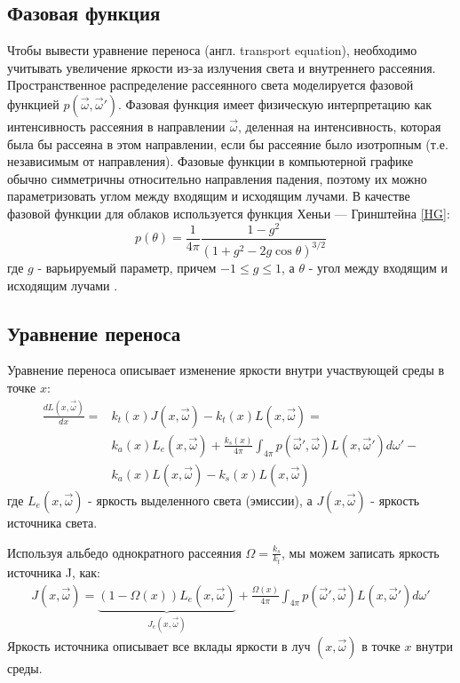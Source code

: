 \subsection{Фазовая функция}
Чтобы вывести уравнение переноса (англ. transport equation), необходимо учитывать увеличение яркости из-за излучения света и внутреннего рассеяния. Пространственное распределение рассеянного света моделируется фазовой функцией $ p(\vec{\omega}, \vec{\omega}') $. Фазовая функция имеет физическую интерпретацию как интенсивность рассеяния в направлении $\vec{\omega}$, деленная на интенсивность, которая была бы рассеяна в этом направлении, если бы рассеяние было изотропным (т.е. независимым от направления). Фазовые функции в компьютерной графике обычно симметричны относительно направления падения, поэтому их можно параметризовать углом между входящим и исходящим лучами. В качестве фазовой функции для облаков используется функция Хеньи — Гринштейна \eqref{HG}:
\begin{equation}
	\label{HG}
	p(\theta) = \frac{1}{4\pi} \frac{1 - g^2}{(1 + g^2 - 2g\cos \theta)^{3/2}}
\end{equation}
где $ g $ - варьируемый параметр, причем $ -1 \leq g \leq 1 $, а $\theta$ - угол между входящим и исходящим лучами \cite{clouds}.

\subsection{Уравнение переноса}
Уравнение переноса описывает изменение яркости внутри участвующей среды в точке $ x $:
\begin{equation}
	\label{rte}
	\begin{aligned}
		\frac{dL(x, \vec{\omega})}{dx} = & k_t(x) J(x, \vec{\omega}) - k_t(x) L(x, \vec{\omega})  = \\
		 & k_a(x) L_e(x, \vec{\omega}) + \frac{k_s(x)}{4\pi} \int_{4\pi} p(\vec{\omega}', \vec{\omega}) L(x, \vec{\omega}') d\omega' - \\
		& k_a(x) L(x, \vec{\omega}) - k_s(x) L(x, \vec{\omega})	
	\end{aligned}
\end{equation}
где $ L_e(x, \vec{\omega}) $ - яркость выделенного света (эмиссии), а $ J(x, \vec{\omega}) $ - яркость источника света. 

Используя альбедо однократного рассеяния $ \Omega = \frac{k_s}{k_t} $, мы можем записать яркость источника J, как:
\begin{equation}
	\label{sourcerad}
	\begin{aligned}
		J(x, \vec{\omega}) = \underbrace{(1 - \Omega(x)) L_e(x, \vec{\omega})}_{J_e(x, \vec{\omega})} + \frac{\Omega(x)}{4\pi} \int_{4\pi} p(\vec{\omega}', \vec{\omega}) L(x, \vec{\omega}') d\omega'
	\end{aligned}
\end{equation}
Яркость источника описывает все вклады яркости в луч $ (x, \vec{\omega}) $ в точке $ x $ внутри среды. 

